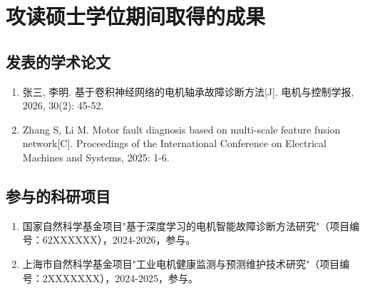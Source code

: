 \chapter*{攻读硕士学位期间取得的成果}

\section*{发表的学术论文}

\begin{enumerate}
	\item 张三, 李明. 基于卷积神经网络的电机轴承故障诊断方法[J]. 电机与控制学报, 2026, 30(2): 45-52.
	\item Zhang S, Li M. Motor fault diagnosis based on multi-scale feature fusion network[C]. Proceedings of the International Conference on Electrical Machines and Systems, 2025: 1-6.
\end{enumerate}

\section*{参与的科研项目}

\begin{enumerate}
	\item 国家自然科学基金项目"基于深度学习的电机智能故障诊断方法研究"（项目编号：62XXXXXX），2024-2026，参与。
	\item 上海市自然科学基金项目"工业电机健康监测与预测维护技术研究"（项目编号：2XXXXXXX），2024-2025，参与。
\end{enumerate}